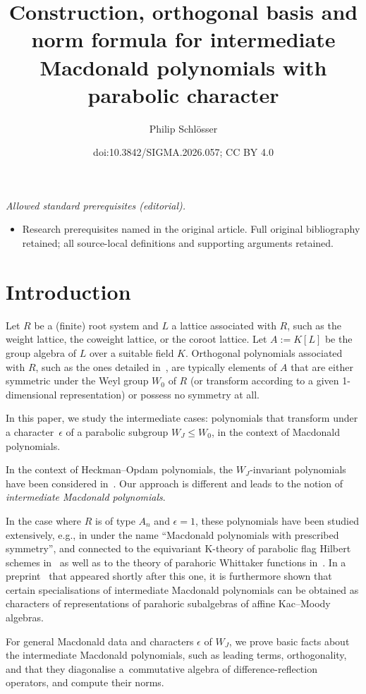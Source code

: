 \documentclass[10pt,a4paper]{amsart}
\title{Construction, orthogonal basis and norm formula for intermediate Macdonald polynomials with parabolic character}
\author{Philip Schlösser}
\date{doi:10.3842/SIGMA.2026.057; CC BY 4.0}
\theoremstyle{definition}
\numberwithin{equation}{section}
\begin{document}
\maketitle
\noindent\textit{Allowed standard prerequisites (editorial).}\begin{itemize}
\item Research prerequisites named in the original article. Full original bibliography retained; all source-local definitions and supporting arguments retained.
\end{itemize}\medskip
\section{Introduction}
Let $R$ be a (finite) root system and $L$ a lattice associated with $R$, such
as the weight lattice, the coweight lattice, or the coroot lattice. Let
$A:= K[L]$ be the group algebra of $L$ over a suitable field $K$. Orthogonal
polynomials associated with $R$, such as the ones detailed in~\cite{cherednikDAHA,macdonald,opdam}, are typically elements of $A$ that are either
symmetric under the Weyl group $W_0$ of $R$ (or transform according to a
given 1-dimensional representation) or possess no symmetry at all.

In this paper, we study the intermediate cases: polynomials
that transform under a character~$\epsilon$ of a parabolic subgroup $W_J\le W_0$, in the
context of Macdonald polynomials.

In the context of Heckman--Opdam polynomials, the $W_J$-invariant polynomials
have been considered in~\cite{mvpVectorValued}. Our approach is
different and leads
to the notion of \emph{intermediate Macdonald polynomials}.

In the case where $R$ is of type $A_n$ and $\epsilon=1$,
these polynomials have been studied extensively, e.g., in
\cite{BDF97, baratta,goodberry,lapointe} under the name ``Macdonald polynomials with prescribed symmetry'', and connected to the
equivariant K-theory of parabolic flag Hilbert schemes in~\cite{goodberryGeometric} as well as to the theory of parahoric Whittaker functions in~\cite{BBBG24}. In a preprint~\cite{FKhM} that appeared shortly after this one, it is furthermore shown that certain specialisations of intermediate Macdonald polynomials can be obtained as characters of representations of parahoric subalgebras of affine Kac--Moody algebras.

For general Macdonald data and characters $\epsilon$ of $W_J$, we prove basic facts about the intermediate Macdonald polynomials,
such as leading terms, orthogonality, and that they diagonalise a~commutative algebra
of difference-reflection operators, and compute their norms.
\end{document}
